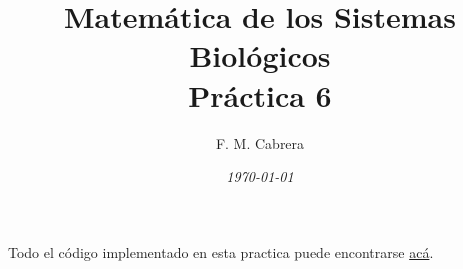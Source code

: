 \documentclass[11pt,a4paper]{article}
\title{\textbf{Matemática de los Sistemas Biológicos \\ Práctica 6}}
\author{
{F. M. Cabrera}
}
\date{\textit{\today}}
\begin{document}
\maketitle



\setcounter{page}{1}




Todo el código implementado en esta practica puede encontrarse \href{https://github.com/cabre94/MSB_IB}{acá}.








\end{document}

